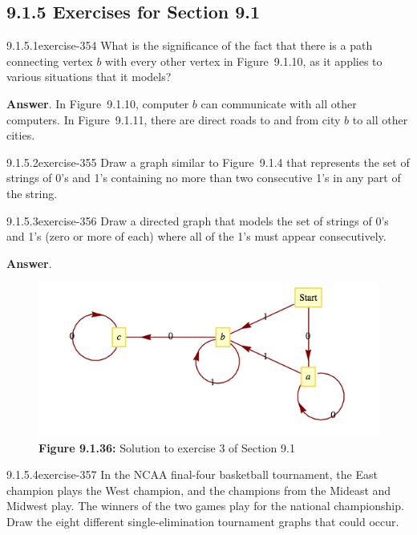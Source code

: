 \documentclass[twoside,10pt,]{book}
\numberwithin{equation}{section}
\begin{document}
\subsection*{9.1.5 Exercises for Section 9.1}
\begin{divisionsolution}{9.1.5.1}{}{exercise-354}%
\hypertarget{p-3072}{}%
What is the significance of the fact that there is a path connecting vertex \(b\) with every other vertex in Figure~9.1.10, as it applies to various situations that it models?%
\par\smallskip%
\noindent\textbf{Answer}.\quad%
\hypertarget{p-3073}{}%
In Figure~9.1.10, computer \(b\) can communicate with all other computers. In Figure~9.1.11, there are direct roads to and from city \(b\) to all other cities.%
\end{divisionsolution}%
\begin{divisionsolution}{9.1.5.2}{}{exercise-355}%
\hypertarget{p-3074}{}%
Draw a graph similar to Figure~9.1.4 that represents the set of strings of 0's and 1's containing no more than two consecutive 1's in any part of the string.%
\end{divisionsolution}%
\begin{divisionsolution}{9.1.5.3}{}{exercise-356}%
\hypertarget{p-3075}{}%
Draw a directed graph that models the set of strings of 0's and 1's (zero or more of each) where all of the 1's must appear consecutively.%
\par\smallskip%
\noindent\textbf{Answer}.\quad%
\leavevmode%
\begin{figure}
\centering
\includegraphics[width=0.75\linewidth]{images/fig-sol-9-1-3.png}
\caption*{\textbf{Figure 9.1.36:} Solution to exercise 3 of Section 9.1}
\end{figure}
\end{divisionsolution}%
\begin{divisionsolution}{9.1.5.4}{}{exercise-357}%
\hypertarget{p-3076}{}%
In the NCAA final-four basketball tournament, the East champion plays the West champion, and the champions from the Mideast and Midwest play. The winners of the two games play for the national championship. Draw the eight different single-elimination tournament graphs that could occur.%
\end{divisionsolution}%
\end{document}
